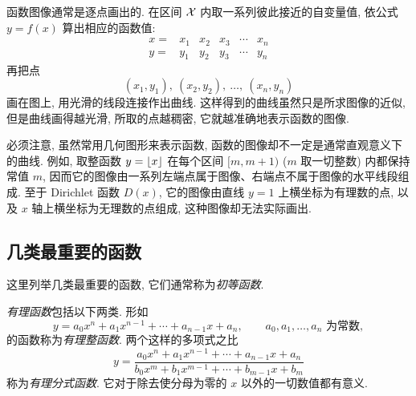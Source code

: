 \begin{figure}
    \vspace{-0.5cm}
    \centering
\end{figure}
函数图像通常是逐点画出的.
在区间 $\mathcal{X}$ 内取一系列彼此接近的自变量值,
依公式 $y=f(x)$ 算出相应的函数值:
$$
\begin{array}{c|ccccc}
x= & x_1 & x_2 & x_3 & \cdots & x_n\\ \hline
y= & y_1 & y_2 & y_3 & \cdots & y_n
\end{array}
$$
再把点
$$
(x_1,y_1),\ (x_2,y_2),\ \ldots,\ (x_n,y_n)
$$
画在图上, 用光滑的线段连接作出曲线.
这样得到的曲线虽然只是所求图像的近似,
但是曲线画得越光滑, 所取的点越稠密, 它就越准确地表示函数的图像.

必须注意, 虽然常用几何图形来表示函数,
函数的图像却不一定是通常直观意义下的曲线.
例如, 取整函数 $y=\left\lfloor x \right\rfloor$ 在每个区间 $[m,m+1)$ ($m$ 取一切整数) 内都保持常值 $m$,
因而它的图像由一系列左端点属于图像、右端点不属于图像的水平线段组成.
至于 Dirichlet 函数 $D(x)$,
它的图像由直线 $y=1$ 上横坐标为有理数的点,
以及 $x$ 轴上横坐标为无理数的点组成, 这种图像却无法实际画出.

\subsection{几类最重要的函数}\label{subsec:48}
这里列举几类最重要的函数, 它们通常称为\emph{初等函数}.

\myrefparagraph{1\textdegree}\label{par:rational_functions}
\emph{有理函数}包括以下两类.
形如
$$
y=a_0x^n+a_1x^{n-1}+\cdots+a_{n-1}x+a_n,
\qquad a_0,a_1,\ldots,a_n\text{ 为常数},
$$
的函数称为\emph{有理整函数}. 两个这样的多项式之比
$$
y=\frac{a_0x^n+a_1x^{n-1}+\cdots+a_{n-1}x+a_n}
{b_0x^m+b_1x^{m-1}+\cdots+b_{m-1}x+b_m}
$$
称为\emph{有理分式函数}. 它对于除去使分母为零的 $x$ 以外的一切数值都有意义.

